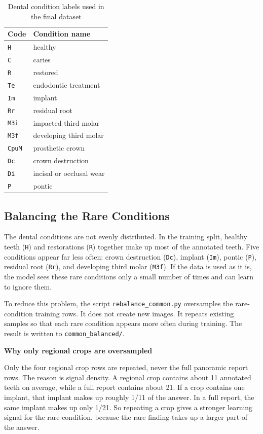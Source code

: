 \documentclass[a4paper,12pt]{report}
\newcommand{\minisection}[1]{%
  \vspace{1ex}
  \noindent\textbf{#1}\par
  \vspace{0.5ex}
}
\begin{document}
\begin{table}[H]
\centering
\caption{Dental condition labels used in the final dataset}
\begin{tabular}{ll}
\toprule
Code & Condition name \\
\midrule
\texttt{H} & healthy \\
\texttt{C} & caries \\
\texttt{R} & restored \\
\texttt{Te} & endodontic treatment \\
\texttt{Im} & implant \\
\texttt{Rr} & residual root \\
\texttt{M3i} & impacted third molar \\
\texttt{M3f} & developing third molar \\
\texttt{CpuM} & prosthetic crown \\
\texttt{Dc} & crown destruction \\
\texttt{Di} & incisal or occlusal wear \\
\texttt{P} & pontic \\
\bottomrule
\end{tabular}
\end{table}


\subsection{Balancing the Rare Conditions}

The dental conditions are not evenly distributed. In the training split, healthy teeth (\texttt{H}) and restorations (\texttt{R}) together make up most of the annotated teeth. Five conditions appear far less often: crown destruction (\texttt{Dc}), implant (\texttt{Im}), pontic (\texttt{P}), residual root (\texttt{Rr}), and developing third molar (\texttt{M3f}). If the data is used as it is, the model sees these rare conditions only a small number of times and can learn to ignore them.

To reduce this problem, the script \texttt{rebalance\_common.py} oversamples the rare-condition training rows. It does not create new images. It repeats existing samples so that each rare condition appears more often during training. The result is written to \texttt{common\_balanced/}.

\minisection{Why only regional crops are oversampled}

Only the four regional crop rows are repeated, never the full panoramic report rows. The reason is signal density. A regional crop contains about 11 annotated teeth on average, while a full report contains about 21. If a crop contains one implant, that implant makes up roughly 1/11 of the answer. In a full report, the same implant makes up only 1/21. So repeating a crop gives a stronger learning signal for the rare condition, because the rare finding takes up a larger part of the answer.
\end{document}
